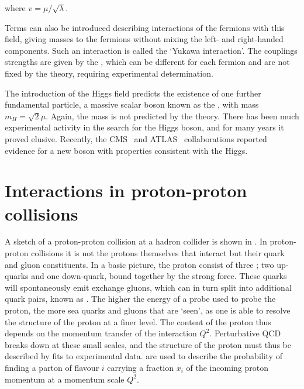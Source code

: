 where $v = \mu / \sqrt{\lambda}$. 

Terms can also be
introduced describing interactions of the fermions with this field, giving
masses to the fermions without mixing the left- and right-handed components.
Such an interaction is called the `Yukawa interaction'. The couplings strengths
are given by the , which can be different for each
fermion and are not fixed by the theory, requiring experimental determination. 

The introduction of the Higgs field predicts the existence of one further
fundamental particle, a massive scalar boson known as the ,
with mass $m_{H} = \sqrt{2}\mu$. Again, the mass is not predicted by the theory. 
There has
been much experimental activity in the search for the Higgs boson, and for many
years it proved elusive. Recently,
the CMS~\cite{CMS_Higgs:2012gu,} and ATLAS~\cite{ATLAS_Higgs:2012gk} collaborations reported evidence for a new boson with
properties consistent with the Higgs.

\section{Interactions in proton-proton collisions}
\label{sec:Theory-ppInteractions}

A sketch of a proton-proton collision at a hadron collider is shown in
. In proton-proton collisions it is not the
protons themselves that interact but their quark and gluon constituents.
In a basic picture, the proton consist of three ;
two up-quarks and one down-quark, bound together by the strong force. These
quarks will spontaneously emit exchange gluons, which can in turn split into
additional quark pairs, known as . The higher the energy of a
probe used to probe the proton, the more sea quarks and gluons that are `seen', as one
is able to resolve the structure of the proton at a finer level. The content of
the proton thus depends on the momentum transfer of the interaction $Q^{2}$.
Perturbative QCD breaks down at these small scales, and the structure of the
proton must thus be described by fits to experimental data.  are used to describe the probability of finding a parton of flavour $i$ carrying a
fraction $x_i$ of the incoming proton momentum at a momentum scale $Q^{2}$.

